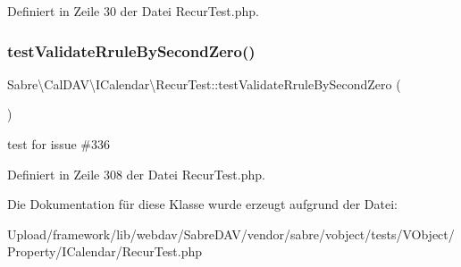 Definiert in Zeile 30 der Datei Recur\+Test.\+php.

\mbox{\label{class_sabre_1_1_v_object_1_1_property_1_1_i_calendar_1_1_recur_test_ae319ab43ccb6d61c7875916f022a463b}} 
\subsubsection{\texorpdfstring{test\+Validate\+Rrule\+By\+Second\+Zero()}{testValidateRruleBySecondZero()}}
{\footnotesize\ttfamily Sabre\textbackslash{}\+Cal\+D\+A\+V\textbackslash{}\+I\+Calendar\textbackslash{}\+Recur\+Test\+::test\+Validate\+Rrule\+By\+Second\+Zero (\begin{DoxyParamCaption}{ }\end{DoxyParamCaption})}

test for issue \#336 

Definiert in Zeile 308 der Datei Recur\+Test.\+php.



Die Dokumentation für diese Klasse wurde erzeugt aufgrund der Datei\+:\begin{DoxyCompactItemize}
\item 
Upload/framework/lib/webdav/\+Sabre\+D\+A\+V/vendor/sabre/vobject/tests/\+V\+Object/\+Property/\+I\+Calendar/Recur\+Test.\+php\end{DoxyCompactItemize}
